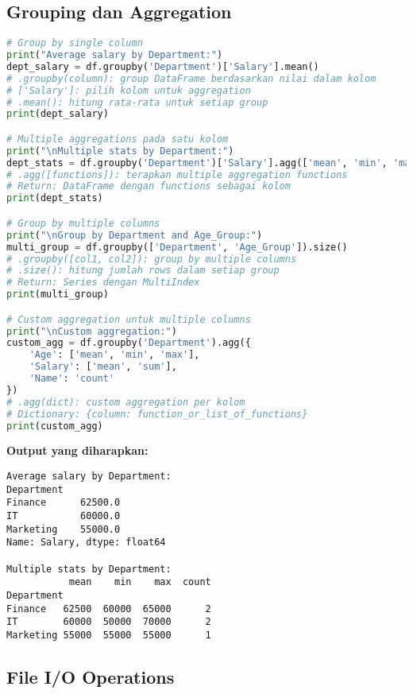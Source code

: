 \subsection*{Grouping dan Aggregation}

\begin{lstlisting}[language=python, caption={Group Operations dan Statistical Aggregation}, style=python]
# Group by single column
print("Average salary by Department:")
dept_salary = df.groupby('Department')['Salary'].mean()
# .groupby(column): group DataFrame berdasarkan nilai dalam kolom
# ['Salary']: pilih kolom untuk aggregation
# .mean(): hitung rata-rata untuk setiap group
print(dept_salary)

# Multiple aggregations pada satu kolom
print("\nMultiple stats by Department:")
dept_stats = df.groupby('Department')['Salary'].agg(['mean', 'min', 'max', 'count'])
# .agg([functions]): terapkan multiple aggregation functions
# Return: DataFrame dengan functions sebagai kolom
print(dept_stats)

# Group by multiple columns
print("\nGroup by Department and Age_Group:")
multi_group = df.groupby(['Department', 'Age_Group']).size()
# .groupby([col1, col2]): group by multiple columns
# .size(): hitung jumlah rows dalam setiap group
# Return: Series dengan MultiIndex
print(multi_group)

# Custom aggregation untuk multiple columns
print("\nCustom aggregation:")
custom_agg = df.groupby('Department').agg({
    'Age': ['mean', 'min', 'max'],
    'Salary': ['mean', 'sum'],
    'Name': 'count'
})
# .agg(dict): custom aggregation per kolom
# Dictionary: {column: function_or_list_of_functions}
print(custom_agg)
\end{lstlisting}

\textbf{Output yang diharapkan:}
\begin{lstlisting}[style=bash]
Average salary by Department:
Department
Finance      62500.0
IT           60000.0
Marketing    55000.0
Name: Salary, dtype: float64

Multiple stats by Department:
           mean    min    max  count
Department
Finance   62500  60000  65000      2
IT        60000  50000  70000      2
Marketing 55000  55000  55000      1
\end{lstlisting}

\subsection*{File I/O Operations}

